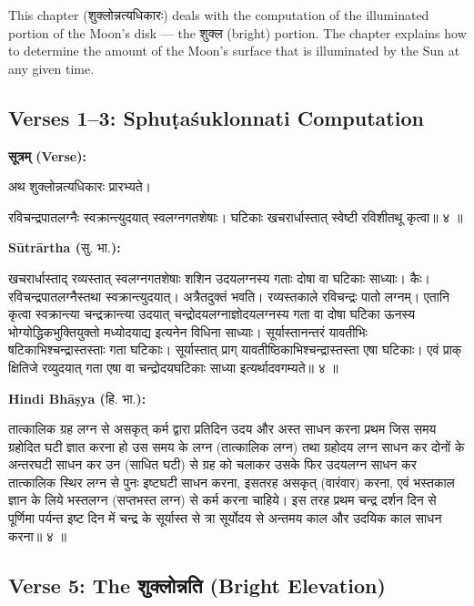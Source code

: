\documentclass[11pt,a4paper]{article}
\newcommand{\dev}[1]{{\devanagarifont #1}}
\newcommand{\arth}{\textbf{Sūtrārtha (}\dev{सु. भा.}\textbf{):}\ }
\newcommand{\hindi}{\textbf{Hindi Bhāṣya (}\dev{हि. भा.}\textbf{):}\ }
\newenvironment{sanskritverse}{%
  \begin{center}\begin{minipage}{0.9\textwidth}
  \setlength{\leftskip}{1em}
  \setlength{\rightskip}{1em}
  \dev
}{\end{minipage}\end{center}}
\begin{document}
This chapter (\dev{शुक्लोन्नत्यधिकारः}) deals with the computation of the
illuminated portion of the Moon's disk — the \dev{शुक्ल} (bright) portion.
The chapter explains how to determine the amount of the Moon's surface that
is illuminated by the Sun at any given time.

\subsection{Verses 1--3: Sphuṭaśuklonnati Computation}

\vspace{0.5em}
\noindent\textbf{\dev{सूत्रम् (Verse):}}
\begin{sanskritverse}
अथ शुक्लोन्नत्यधिकारः प्रारभ्यते।
\end{sanskritverse}

\begin{sanskritverse}
रविचन्द्रपातलग्नैः स्वक्रान्त्युदयात् स्वलग्नगतशेषाः।
घटिकाः खचरार्धास्तात् स्वेष्टी रविशीतथू कृत्वा॥ ४ ॥
\end{sanskritverse}

\noindent\arth
\begin{sanskritverse}
खचरार्धास्ताद् रव्यस्तात् स्वलग्नगतशेषाः शशिन उदयलग्नस्य गताः दोषा वा
घटिकाः साध्याः। कैः। रविचन्द्रपातलग्नैस्तथा स्वक्रान्त्युदयात्। अत्रैतदुक्तं भवति।
रव्यस्तकाले रविचन्द्रः पातो लग्नम्। एतानि कृत्वा स्वक्रान्त्या चन्द्रक्रान्त्या
उदयात् चन्द्रोदयलग्नाज्ञोदयलग्नस्य गता वा दोषा घटिका ऊनस्य भोग्योद्धिकभुक्तियुक्तो
मध्योदयाद्य इत्यनेन विधिना साध्याः। सूर्यास्तानन्तरं यावतीभिः षटिकाभिश्चन्द्रास्तस्ताः
गता घटिकाः। सूर्यास्तात् प्राग् यावतीष्ठिकाभिश्चन्द्रास्तस्ता एषा घटिकाः। एवं प्राक्
क्षितिजे रव्युदयात् गता एषा वा चन्द्रोदयघटिकाः साध्या इत्यर्थादवगम्यते॥ ४ ॥
\end{sanskritverse}

\noindent\hindi
\begin{sanskritverse}
तात्कालिक ग्रह लग्न से असकृत् कर्म द्वारा प्रतिदिन उदय और अस्त साधन करना प्रथम
जिस समय ग्रहोदित घटी ज्ञात करना हो उस समय के लग्न (तात्कालिक लग्न) तथा
ग्रहोदय लग्न साधन कर दोनों के अन्तरघटी साधन कर उन (साधित घटी) से ग्रह को
चलाकर उसके फिर उदयलग्न साधन कर तात्कालिक स्थिर लग्न से पुनः इष्टघटी साधन
करना, इसतरह असकृत् (वारंवार) करना, एवं भस्तकाल ज्ञान के लिये भस्तलग्न (सप्तभस्त
लग्न) से कर्म करना चाहिये। इस तरह प्रथम चन्द्र दर्शन दिन से पूर्णिमा पर्यन्त इष्ट
दिन में चन्द्र के सूर्यास्त से त्रा सूर्योदय से अन्तमय काल और उदयिक काल साधन करना॥ ४ ॥
\end{sanskritverse}

\subsection{Verse 5: The \dev{शुक्लोन्नति} (Bright Elevation)}
\end{document}
